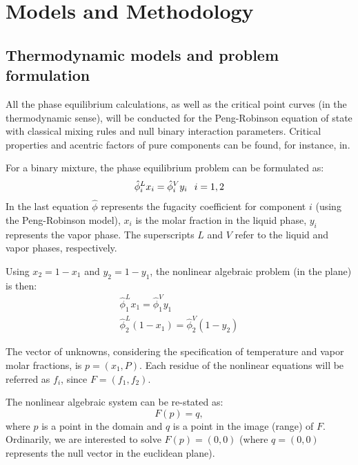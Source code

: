 \documentclass{article}
\theoremstyle{definition}
\theoremstyle{remark}
\begin{document}
\section{Models and Methodology}

\subsection{Thermodynamic models and problem formulation}

All the phase equilibrium calculations, as well as the critical point curves (in the thermodynamic sense), will be conducted for the Peng-Robinson equation of state with classical mixing rules and null binary interaction parameters. Critical properties and acentric factors of pure components can be found, for instance, in\cite{ireme}.

For a binary mixture, the phase equilibrium problem can be formulated as:
\begin{eqnarray}
\hat{\phi}_i^L x_i = \hat{\phi}_i^V y_i \hspace{0.1in} i = 1,2
\end{eqnarray}
In the last equation $\hat{\phi}$ represents the fugacity coefficient for component $i$ (using the Peng-Robinson model), $x_i$ is the molar fraction in the liquid phase, $y_i$ represents the vapor phase. The superscripts $L$ and $V$ refer to the liquid and vapor phases, respectively.

Using $x_2 = 1 - x_1$ and $y_2 = 1 - y_1$, the nonlinear algebraic problem (in the plane) is then:
\begin{eqnarray}
\hat{\phi}_1^L x_1 = \hat{\phi}_1^V y_1 \\
\hat{\phi}_2^L (1-x_1) = \hat{\phi}_2^V (1-y_2)
\end{eqnarray}

The vector of unknowns, considering the specification of temperature and vapor molar fractions, is $p = (x_1,P)$. Each residue of the nonlinear equations will be referred as $f_i$, since $F = (f_1,f_2)$.

The nonlinear algebraic system can be re-stated as:
\begin{equation}
F(p) = q,
\end{equation}
where $p$ is a point in the domain and $q$ is a point in the image (range) of $F$. Ordinarily, we are interested to solve $F(p) = (0,0)$ (where $q=(0,0)$ represents the null vector in the euclidean plane).
\end{document}

